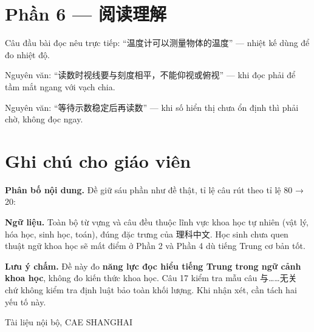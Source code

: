 \documentclass[11pt, a4paper]{article}
\begin{document}
\section*{Phần 6 — 阅读理解}

\begin{dapan}[18 — Đáp án A]
Câu đầu bài đọc nêu trực tiếp: “温度计可以测量物体的温度” — nhiệt kế dùng để đo nhiệt độ.
\end{dapan}

\begin{dapan}[19 — Đáp án B]
Nguyên văn: “读数时视线要与刻度相平，不能仰视或俯视” — khi đọc phải để tầm mắt ngang với vạch chia.
\end{dapan}

\begin{dapan}[20 — Đáp án C]
Nguyên văn: “等待示数稳定后再读数” — khi số hiển thị chưa ổn định thì phải chờ, không đọc ngay.
\end{dapan}

\section*{Ghi chú cho giáo viên}

\noindent\textbf{Phân bố nội dung.} Đề giữ sáu phần như đề thật, tỉ lệ câu rút theo tỉ lệ 80 → 20:


\vspace{0.3cm}
\noindent\textbf{Ngữ liệu.} Toàn bộ từ vựng và câu đều thuộc lĩnh vực khoa học tự nhiên (vật lý, hóa học, sinh học, toán), đúng đặc trưng của 理科中文. Học sinh chưa quen thuật ngữ khoa học sẽ mất điểm ở Phần 2 và Phần 4 dù tiếng Trung cơ bản tốt.

\vspace{0.2cm}
\noindent\textbf{Lưu ý chấm.} Đề này đo \textbf{năng lực đọc hiểu tiếng Trung trong ngữ cảnh khoa học}, không đo kiến thức khoa học. Câu 17 kiểm tra mẫu câu 与……无关 chứ không kiểm tra định luật bảo toàn khối lượng. Khi nhận xét, cần tách hai yếu tố này.

\vspace{0.8cm}
\begin{center}
{\footnotesize\color{cae_blue} Tài liệu nội bộ, CAE SHANGHAI}
\end{center}
\end{document}
